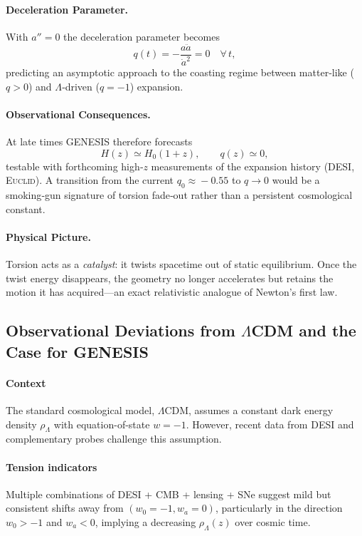 \documentclass{article}
\begin{document}
\paragraph{Deceleration Parameter.}
With $a''=0$ the deceleration parameter becomes
\[
q(t)=-\frac{a\ddot a}{\dot a^{2}}=0 \quad\forall\,t,
\]
predicting an asymptotic approach to the coasting regime between matter‑like ($q>0$) and
$\Lambda$‑driven ($q=-1$) expansion.

\paragraph{Observational Consequences.}
At late times GENESIS therefore forecasts
\[
H(z)\simeq H_{0}(1+z),\qquad q(z)\simeq 0 ,
\]
testable with forthcoming high‑$z$ measurements of the expansion history
(\textsc{DESI}, \textsc{Euclid}).  
A transition from the current $q_{0}\!\approx\!-0.55$ to $q\!\rightarrow\!0$ would be a smoking‑gun
signature of torsion fade‑out rather than a persistent cosmological constant.

\paragraph{Physical Picture.}
Torsion acts as a \emph{catalyst}: it twists spacetime out of static equilibrium.
Once the twist energy disappears, the geometry no longer accelerates but retains the
motion it has acquired—an exact relativistic analogue of Newton’s first law.





\subsection{Observational Deviations from \texorpdfstring{$\Lambda$}{Λ}CDM and the Case for GENESIS}

\label{sec:tension-lcdm}

\paragraph{Context}
The standard cosmological model, $\Lambda$CDM, assumes a constant dark energy density $\rho_\Lambda$ with equation-of-state $w = -1$. However, recent data from DESI and complementary probes challenge this assumption.

\paragraph{Tension indicators}
Multiple combinations of DESI + CMB + lensing + SNe suggest mild but consistent shifts away from $(w_0 = -1, w_a = 0)$, particularly in the direction $w_0 > -1$ and $w_a < 0$, implying a decreasing $\rho_\Lambda(z)$ over cosmic time.
\end{document}
